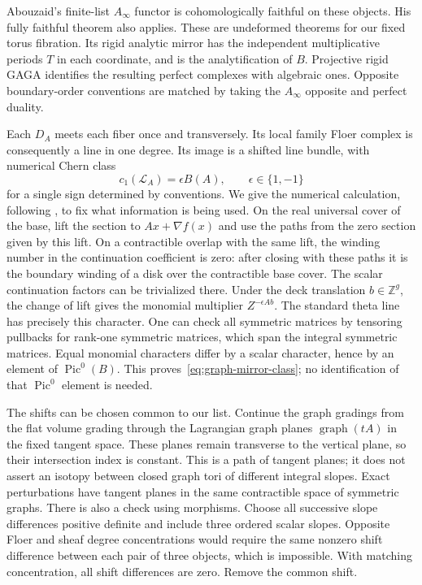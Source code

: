 \documentclass[11pt]{article}
\numberwithin{equation}{section}
\theoremstyle{definition}
\theoremstyle{remark}
\newcommand{\Z}{\mathbb Z}
\begin{document}
Abouzaid's finite-list $A_\infty$ functor
\cite[Theorem~2.10 and the chain-level construction]{HMS:AbouzaidFaithful}
is cohomologically faithful on these objects.  His fully faithful theorem
\cite[Theorem~1.1 and Corollary~1.2]{HMS:AbouzaidHMS} also applies.  These are undeformed
theorems for our fixed torus fibration.  Its rigid analytic mirror has the
independent multiplicative periods $T$ in each coordinate, and is the
analytification of $B$.  Projective rigid GAGA identifies the resulting
perfect complexes with algebraic ones.  Opposite boundary-order conventions
are matched by taking the $A_\infty$ opposite and perfect duality.

Each $D_A$ meets each fiber once and transversely.  Its local family Floer
complex is consequently a line in one degree.  Its image is a shifted
line bundle, with numerical Chern class
\begin{equation}\label{eq:graph-mirror-class}
 c_1(\mathcal L_A)=\epsilon B(A),\qquad \epsilon\in\{1,-1\}
\end{equation}
for a single sign determined by conventions.  We give the numerical
calculation, following \cite[Section~9.1]{W}, to fix what information
is being used.  On the real universal
cover of the base, lift the section to $Ax+\nabla f(x)$ and use the paths
from the zero section given by this lift.  On a contractible overlap with
the same lift, the winding number in the continuation coefficient is zero:
after closing with these paths it is the boundary winding of a disk over
the contractible base cover.  The scalar continuation factors can be
trivialized there.  Under the deck translation $b\in\Z^g$, the change of
lift gives the monomial multiplier $Z^{-\epsilon Ab}$.  The standard theta
line has precisely this character.  One can check all symmetric matrices
by tensoring pullbacks for rank-one symmetric matrices, which span the
integral symmetric matrices.  Equal monomial characters differ by a
scalar character, hence by an element of $\operatorname{Pic}^0(B)$.
This proves~\eqref{eq:graph-mirror-class}; no identification of that
$\operatorname{Pic}^0$ element is needed.

The shifts can be chosen common to our list.  Continue the graph gradings
from the flat volume grading through the Lagrangian graph planes
$\operatorname{graph}(tA)$ in the fixed tangent space.  These planes
remain transverse to the vertical plane, so their intersection
index is constant.  This is a path of tangent planes; it does not
assert an isotopy between closed graph tori of different integral
slopes.  Exact perturbations have tangent planes in the same
contractible space of symmetric graphs.  There is also a check using morphisms.  Choose all
successive slope differences positive definite and include three ordered
scalar slopes.  Opposite Floer and sheaf degree concentrations would
require the same nonzero shift difference between each pair of three
objects, which is impossible.  With matching concentration, all shift
differences are zero.  Remove the common shift.
\end{document}
